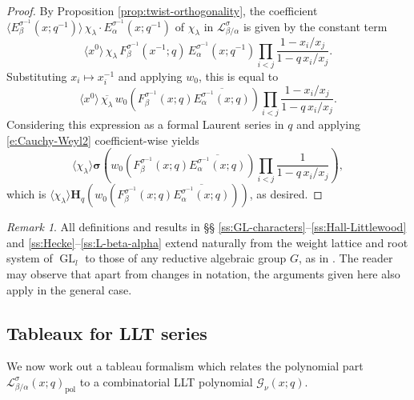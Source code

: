 \documentclass[12pt]{amsart}
\theoremstyle{definition}
\theoremstyle{remark}
\newtheorem{remark}[thm]{Remark}
\newcommand{\Hbold}{{\mathbf H}}
\newcommand{\sigmabold}{{\boldsymbol \sigma }}
\newcommand{\Gcal}{{\mathcal G}}
\newcommand{\Lcal}{{\mathcal L}}
\DeclareMathOperator{\pol}{pol}
\DeclareMathOperator{\GL}{GL}
\begin{document}
\begin{proof}
By Proposition \ref{prop:twist-orthogonality}, the coefficient $
\langle E^{\sigma ^{-1}}_{\beta }(x;q^{-1}) \rangle \, \chi _{\lambda
} \cdot E^{\sigma ^{-1}}_{\alpha }(x;q^{-1})$ of $\chi _{\lambda }$ in
$\Lcal ^{\sigma }_{\beta /\alpha }$ is given by the constant term
\begin{equation}\label{e:LLT-coef}
\langle x^{0} \rangle\, \chi _{\lambda }\, F^{\sigma ^{-1}}_{\beta
}(x^{-1};q)\, E^{\sigma ^{-1}}_{\alpha }(x;q^{-1}) \prod
_{i<j}\frac{1-x_{i}/x_{j}}{1-q\, x_{i}/x_{j}}.
\end{equation}
Substituting $x_{i}\mapsto x_{i}^{-1}$ and applying $w_{0}$, this is
equal to
\begin{equation}\label{e:LLT-coef-bis}
\langle x^{0} \rangle\, \overline{\chi _{\lambda }}\, w_{0}(F^{\sigma
^{-1}}_{\beta }(x;q) \overline{E^{\sigma ^{-1}}_{\alpha }(x;q)}) \prod
_{i<j}\frac{1-x_{i}/x_{j}}{1-q\, x_{i}/x_{j}}.
\end{equation}
Considering this expression as a formal Laurent series in $q$ and
applying \eqref{e:Cauchy-Weyl2} coefficient-wise yields
\begin{equation}
\langle \chi _{\lambda } \rangle \sigmabold \left(
w_{0}(F^{\sigma^{-1}}_{\beta }(x;q) \overline{E^{\sigma ^{-1}}_{\alpha
}(x;q)}) \prod_{i<j}\frac{1}{1-q\, x_{i}/x_{j}} \right),
\end{equation}
which is $\langle \chi _{\lambda } \rangle \Hbold _{q}(w_{0}(F^{\sigma
^{-1} }_{\beta }(x;q) \overline{E^{\sigma ^{-1}}_{\alpha }(x;q)}))$,
as desired.
\end{proof}

\begin{remark}\label{rem:general-type}
All definitions and results in \S\S
\ref{ss:GL-characters}--\ref{ss:Hall-Littlewood} and
\ref{ss:Hecke}--\ref{ss:L-beta-alpha} extend naturally from the weight
lattice and root system of $\GL_{l}$ to those of any reductive
algebraic group $G$, as in \cite{GrojHaim07}.  The reader may observe
that apart from changes in notation, the arguments given here also
apply in the general case.
\end{remark}

\subsection{Tableaux for LLT series}
\label{ss:LLT-tableaux}

We now work out a tableau formalism which relates the polynomial part
$\Lcal ^{\sigma }_{\beta /\alpha }(x;q)_{\pol }$ to a combinatorial
LLT polynomial $\Gcal _{\nu }(x;q)$.
\end{document}
